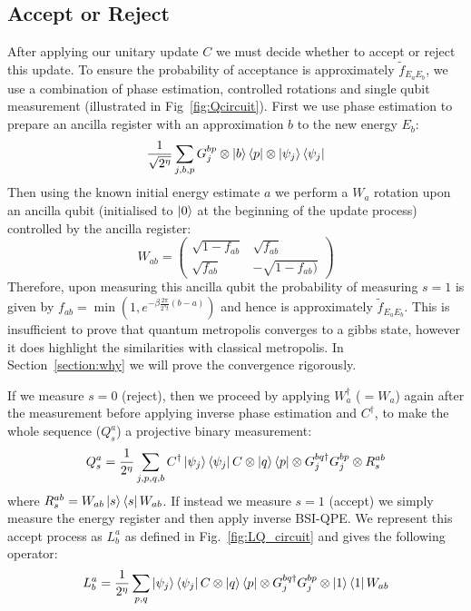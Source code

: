 \documentclass[aps,floatfix,10pt,amssymb,amsfont,amsmath,superscriptaddress,float,nofootinbib,longbibliography,nobalancelastpage,twocolumn]{revtex4-2}
\begin{document}
\subsection{Accept or Reject}
\label{section:acceptprob}
After applying our unitary update $C$ we must decide whether to accept or reject this update. To ensure the probability of acceptance is approximately $\tilde{f}_{E_aE_b}$, we use a combination of phase estimation, controlled rotations and single qubit measurement (illustrated in Fig~\ref{fig:Qcircuit}). First we use phase estimation to prepare an ancilla register with an approximation $b$ to the new energy $E_b$:
\begin{equation}
   \frac{1}{\sqrt{2^{\eta}}}\sum_{j,b,p}G_j^{bp}\otimes\ket{b}\bra{p}\otimes\ket{\psi_j}\bra{\psi_j}
\end{equation}
Then using the known initial energy estimate $a$ we perform a $W_{a}$ rotation upon an ancilla qubit (initialised to $\ket{0}$ at the beginning of the update process) controlled by the ancilla register:
\begin{equation}
    W_{ab} = \begin{pmatrix}
        \sqrt{1 - f_{ab}} & \sqrt{f_{ab}}\\
       \sqrt{f_{ab}} & -\sqrt{1 - f_{ab})}
    \end{pmatrix}
\end{equation}
Therefore, upon measuring this ancilla qubit the probability of measuring $s=1$ is given by $f_{ab} =\min(1, e^{-\beta\frac{2\pi}{2^{\eta}t}(b-a)})$ and hence is approximately $\tilde f_{E_aE_b}$. This is insufficient to prove that quantum metropolis converges to a gibbs state, however it does highlight the similarities with classical metropolis. In Section~\ref{section:why} we will prove the convergence rigorously.

If we measure $s=0$ (reject), then we proceed by applying $W_{a}^{\dagger}$ ($=W_a$) again after the measurement before applying inverse phase estimation and $C^{\dagger}$, to make the whole sequence ($Q_s^a$) a projective binary measurement:
\begin{equation} 
    Q_s^a = \frac{1}{2^{\eta}}\sum_{j,p,q,b}  C^{\dagger}\ket{\psi_j}\bra{\psi_j}C \otimes \ket{q}\bra{p} \otimes G_j^{bq\dagger}G_j^{bp}\otimes R^{ab}_s
\end{equation}
where $R^{ab}_s = W_{ab}\ket{s}\bra{s}W_{ab}$. If instead we measure $s=1$ (accept) we simply measure the energy register and then apply inverse BSI-QPE. We represent this accept process as $L^a_b$ as defined in Fig.~\ref{fig:LQ_circuit} and gives the following operator:
\begin{equation}
    L^a_b = \frac{1}{2^{\eta}}\sum_{p,q}\ket{\psi_j}\bra{\psi_j}C \otimes \ket{q}\bra{p} \otimes G^{bq\dagger}_j G^{bp}_j \otimes \ket{1}\bra{1}W_{ab}
\end{equation}
\end{document}
